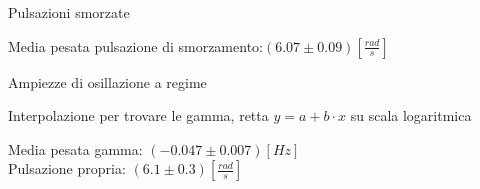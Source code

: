 %	

\begin{tabella}
	\centering
	
	\caption{Pulsazioni smorzate}
	\label{tab:pulssmorz}
\end{tabella}
Media pesata pulsazione di smorzamento:$ (6.07 \pm 0.09) [\frac{rad}{s}]$ \\

\begin{tabella}
	\centering
	
	\caption{Ampiezze di osillazione a regime}
	\label{tab:regime}
\end{tabella}

\begin{tabella}
	\centering
	
	\caption{Interpolazione per trovare le gamma, retta $y=a+b \cdot x$ su scala logaritmica}
	\label{tab:gamma}
\end{tabella}
\noindent 
Media pesata gamma: $(-0.047 \pm 0.007) [Hz] $\\
Pulsazione propria: $(6.1 \pm 0.3) [\frac{rad}{s}]$\\

